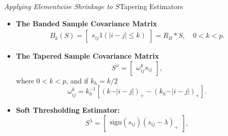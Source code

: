 \begin{frame}{\textit{Applying Elementwise Shrinkage to $S$}}{Tapering Estimators}\label{shrinkage-estimators}
	\footnotesize
	\begin{itemize}
 	\item \textbf{The Banded Sample Covariance Matrix} 
	\begin{align*}%
		B_k\left(S\right) = \begin{bmatrix} s_{ij} 1\left(\vert i-j \vert \le k\right) \end{bmatrix} = R_B \ast S,\quad 0 < k < p.
		\end{align*}
	\item \textbf{The Tapered Sample Covariance Matrix} 
		 	\begin{equation*}%
			S^{\omega} =  \begin{bmatrix} \omega_{ij}^k s_{ij} \end{bmatrix},
			\end{equation*}
		where $0 < k < p$, and if $k_h = k/2$ 
		\begin{equation*}
		\omega^k_{ij} = k_h^{-1} \left[ \left( k - \vert i-j\vert\right)_+ - \left(k_h - \vert i-j\vert\right)_+ \right].
		\end{equation*}
	\item \textbf{Soft Thresholding Estimator:} 
			\begin{equation*}%
			S^{\lambda} =   \begin{bmatrix} \mbox{sign}\left(s_{ij}\right) \left(s_{ij} - \lambda\right)_+ \end{bmatrix},
			\end{equation*}	\footnotesize
	\end{itemize}
\hyperlink{simulation-studies-benchmark-estimators}{}
\end{frame}


